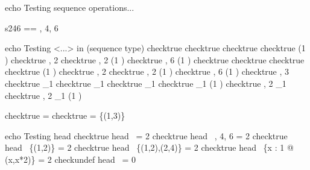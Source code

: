 %


echo Testing sequence operations...

\begin{zed}
   s246 == , 4, 6 \rangle
\end{zed}

echo     Testing <...> in (sequence type)
checktrue \langle \rangle \in \seq \nat
checktrue \langle \rangle \in \seq \langle \rangle
checktrue  \rangle \in \seq \nat
checktrue  \rangle \in \seq (1 )
checktrue , 2 \rangle \in \seq \nat
checktrue , 2 \rangle \in \seq (1 )
checktrue , 6 \rangle \notin \seq (1 )
%
checktrue \langle \rangle \in \iseq \nat
checktrue \langle \rangle \in \iseq \langle \rangle
checktrue  \rangle \in \iseq \nat
checktrue  \rangle \in \iseq (1 )
checktrue , 2 \rangle \in \iseq \nat
checktrue , 2 \rangle \in \iseq (1 )
checktrue , 6 \rangle \notin \iseq (1 )
checktrue , 3 \rangle \notin \iseq \nat
%
checktrue \langle \rangle \notin \seq_1 \nat
checktrue \langle \rangle \notin \seq_1 \langle \rangle
checktrue  \rangle \in \seq_1 \nat
checktrue  \rangle \in \seq_1 (1 )
checktrue , 2 \rangle \in \seq_1 \nat
checktrue , 2 \rangle \in \seq_1 (1 )

checktrue \langle \rangle = \emptyset
checktrue  \rangle = \{(1,3)\}

echo     Testing head
checktrue head~  \rangle = 2
checktrue head~ , 4, 6 \rangle = 2
checktrue head~ \{(1,2)\} = 2
checktrue head~ \{(1,2),(2,4)\} = 2
checktrue head~ \{x : 1  @ (x,x*2)\} = 2
checkundef head~ \langle \rangle = 0

